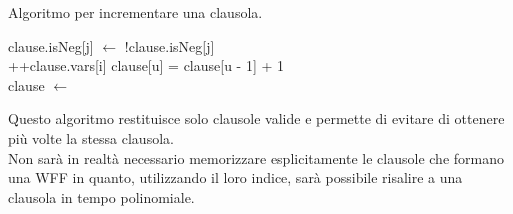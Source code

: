 \begin{algorithm}[H]
    \caption{Algoritmo per incrementare una clausola.}
    \label{alg:increment_clause}
    \begin{algorithmic}[1]
                \State clause.isNeg[j] $\gets$ !clause.isNeg[j]
                    \State \Return
                \EndIf
            \EndFor\\
            
                    \State ++clause.vars[i]
                        \State clause[u] = clause[u - 1] + 1
                    \EndFor
                    \State \Return
                \EndIf
            \EndFor\\
            
            \State clause $\gets$ 
        \EndProcedure
    \end{algorithmic}
\end{algorithm}
Questo algoritmo restituisce solo clausole valide e permette di 
evitare di ottenere più volte la stessa clausola.\\
Non sarà in realtà necessario memorizzare esplicitamente le clausole che formano una WFF 
in quanto, utilizzando il loro indice, sarà possibile risalire a una clausola in tempo polinomiale.

